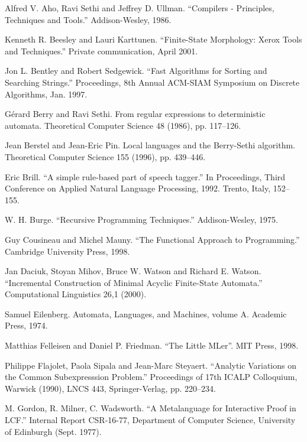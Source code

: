 \begin{thebibliography}{10}

 Alfred V. Aho, Ravi Sethi and Jeffrey D. Ullman.
``Compilers - Principles, Techniques and Tools.'' Addison-Wesley, 1986.

 Kenneth R. Beesley and Lauri Karttunen. ``Finite-State 
Morphology: Xerox Tools and Techniques.'' Private communication, April 2001.

 Jon L. Bentley and Robert Sedgewick.
``Fast Algorithms for Sorting and Searching Strings.'' 
Proceedings, 8th Annual ACM-SIAM Symposium on Discrete Algorithms, Jan. 1997.

G\'erard Berry and Ravi Sethi.
From regular expressions to deterministic automata.
Theoretical Computer Science 48 (1986), pp. 117--126.

Jean Berstel and Jean-Eric Pin. Local languages and the {Berry}-{Sethi} algorithm.
Theoretical Computer Science 155 (1996), pp. 439--446.

 Eric Brill. ``A simple rule-based part of speech tagger.''
In Proceedings, Third Conference on Applied Natural Language Processing, 1992.
Trento, Italy, 152--155. 

 W. H. Burge. ``Recursive Programming Techniques.''
Addison-Wesley, 1975. 

 Guy Cousineau and Michel Mauny. ``The Functional Approach to
Programming.'' Cambridge University Press, 1998.

 Jan Daciuk, Stoyan Mihov, Bruce W. Watson and Richard E. 
Watson. ``Incremental Construction of Minimal Acyclic Finite-State Automata.''
Computational Linguistics 26,1 (2000). 

Samuel Eilenberg. Automata, Languages, and Machines, volume A.
Academic Press, 1974.

 Matthias Felleisen and Daniel P. Friedman. ``The Little MLer''. 
MIT Press, 1998.

 Philippe Flajolet, Paola Sipala and Jean-Marc Steyaert.
``Analytic Variations on the Common Subexpresssion Problem.'' Proceedings of
17th ICALP  Colloquium, Warwick (1990), LNCS 443, Springer-Verlag,
pp. 220--234.

M.  Gordon, R.  Milner, C.  Wadsworth.
``A Metalanguage for Interactive Proof in LCF.''
Internal Report CSR-16-77, Department of Computer Science,
University of Edinburgh (Sept. 1977).


\end{thebibliography}
